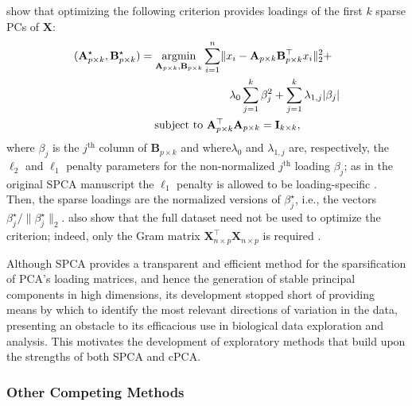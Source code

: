 \citet{Zou2006} show that optimizing the following criterion provides loadings of the first $k$ sparse PCs of $\mathbf{X}$:
\begin{equation}\label{eq:spca}
\begin{aligned}
  (\mathbf{A}^\star_{p \times k}, \mathbf{B}^\star_{p \times k}) & =
    \operatorname*{argmin}_{\mathbf{A}_{p \times k}, \mathbf{B}_{p \times k}}
    \sum_{i=1}^n \lVert x_i - \mathbf{A}_{p \times k}\mathbf{B}_{p \times k}^\top x_i \rVert_2^2 + \\
    & \quad \quad \quad \quad \quad \quad \quad \quad \lambda_0 \sum_{j=1}^k\beta_j^2 +
    \sum_{j=1}^k\lambda_{1,j} \lvert \beta_j \rvert \\
  & \quad \; \text{subject to }\mathbf{A}_{p \times k}^\top\mathbf{A}_{p \times k} = \mathbf{I}_{k \times k},
\end{aligned}
\end{equation}
where $\beta_j$ is the $j^{\text{th}}$ column of $\mathbf{B}_{p \times k}$ and where$\lambda_0$ and $\lambda_{1,j}$ are, respectively, the $\ell_2$ and $\ell_1$ penalty parameters for the non-normalized $j^{\text{th}}$  loading $\beta_j$; as in the original SPCA manuscript the $\ell_1$ penalty is allowed to be loading-specific \cite{Zou2006}. Then, the sparse loadings are the normalized versions of $\beta_j^\star$, i.e., the vectors $\beta_j^\star/\lVert\beta_j^\star\rVert_2$. \citet{Zou2006} also show that the full dataset need not be used to optimize the criterion; indeed, only the Gram matrix $\mathbf{X}_{n \times p}^\top\mathbf{X}_{n \times p}$ is required \cite{Zou2006}. 

Although SPCA provides a transparent and efficient method for the sparsification of PCA's loading matrices, and hence the generation of stable principal components in high dimensions, its development stopped short of providing means by which to identify the most relevant directions of variation in the data, presenting an obstacle to its efficacious use in biological data exploration and analysis. This motivates the development of exploratory methods that build upon the strengths of both SPCA and cPCA.

\subsubsection{Other Competing Methods}\label{others}

